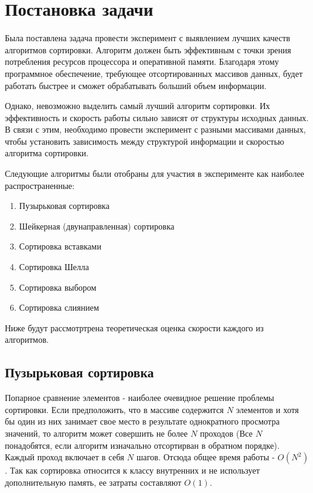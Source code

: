 \section{Постановка задачи}
Была поставлена задача провести эксперимент с выявлением лучших качеств
алгоритмов сортировки. Алгоритм должен быть эффективным с точки зрения
потребления ресурсов процессора и оперативной памяти. Благодаря этому
программное обеспечение, требующее отсортированных массивов данных, будет 
работать быстрее и сможет обрабатывать больший объем информации.\par
Однако, невозможно выделить самый лучший алгоритм сортировки. Их эффективность
и скорость работы сильно зависят от структуры исходных данных. В связи с этим,
необходимо провести эксперимент с разными массивами данных, чтобы установить зависимость
между структурой информации и скоростью алгоритма сортировки.\par
Следующие алгоритмы были отобраны для участия в эксперименте как наиболее распространенные:
\begin{enumerate}
    \item Пузырьковая сортировка
    \item Шейкерная (двунаправленная) сортировка
    \item Сортировка вставками
    \item Сортировка Шелла
    \item Сортировка выбором
    \item Сортировка слиянием
\end{enumerate}
Ниже будут рассмотртрена теоретическая оценка скорости каждого из алгоритмов.

\subsection{Пузырьковая сортировка}
Попарное сравнение элементов - наиболее очевидное решение проблемы сортировки.
Если предположить, что в массиве содержится $N$ элементов и хотя бы один из них
занимает свое место в результате однократного просмотра значений, то алгоритм может
совершить не более $N$ проходов (Все $N$ понадобятся, если алгоритм изначально
отсортирван в обратном порядке). Каждый проход включает в себя $N$ шагов. Отсюда
общее время работы - \textbf{$O(N^2)$}. Так как сортировка относится к классу внутренних
и не использует дополнительную память, ее затраты составляют \textbf{$O(1)$}.\cite{Stephens}

